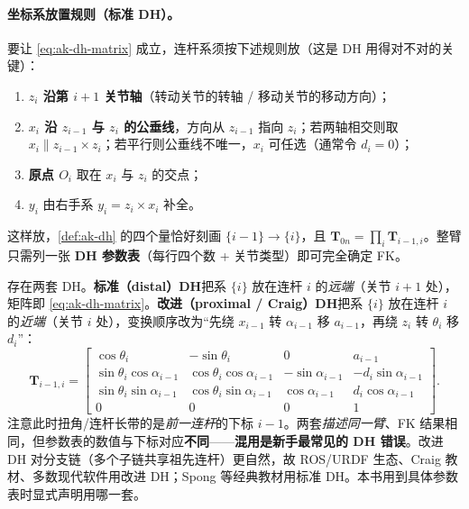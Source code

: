 \paragraph{坐标系放置规则（标准 DH）。}
要让 \cref{eq:ak-dh-matrix} 成立，连杆系须按下述规则放（这是 DH 用得对不对的关键）\cite{spong2006robot}：
\begin{enumerate}
  \item \textbf{$z_i$ 沿第 $i+1$ 关节轴}（转动关节的转轴 / 移动关节的移动方向）；
  \item \textbf{$x_i$ 沿 $z_{i-1}$ 与 $z_i$ 的公垂线}，方向从 $z_{i-1}$ 指向 $z_i$；若两轴相交则取 $x_i\parallel z_{i-1}\times z_i$；若平行则公垂线不唯一，$x_i$ 可任选（通常令 $d_i=0$）；
  \item \textbf{原点 $O_i$} 取在 $x_i$ 与 $z_i$ 的交点；
  \item \textbf{$y_i$} 由右手系 $y_i=z_i\times x_i$ 补全。
\end{enumerate}
这样放，\cref{def:ak-dh} 的四个量恰好刻画 $\{i-1\}\to\{i\}$，且 $\mathbf{T}_{0n}=\prod_i\mathbf{T}_{i-1,i}$。整臂只需列一张 \textbf{DH 参数表}（每行四个数 + 关节类型）即可完全确定 FK。

\begin{note}[标准 DH vs 改进 DH（Craig 约定）]\label{note:ak-dh-modified}
存在两套 DH。\textbf{标准（distal）DH}把系 $\{i\}$ 放在连杆 $i$ 的\emph{远端}（关节 $i+1$ 处），矩阵即 \cref{eq:ak-dh-matrix}。\textbf{改进（proximal / Craig）DH}把系 $\{i\}$ 放在连杆 $i$ 的\emph{近端}（关节 $i$ 处），变换顺序改为“先绕 $x_{i-1}$ 转 $\alpha_{i-1}$ 移 $a_{i-1}$，再绕 $z_i$ 转 $\theta_i$ 移 $d_i$”\cite{spong2006robot}：
\[
  \mathbf{T}_{i-1,i}=
  \begin{bmatrix}
    \cos\theta_i & -\sin\theta_i & 0 & a_{i-1}\\
    \sin\theta_i\cos\alpha_{i-1} & \cos\theta_i\cos\alpha_{i-1} & -\sin\alpha_{i-1} & -d_i\sin\alpha_{i-1}\\
    \sin\theta_i\sin\alpha_{i-1} & \cos\theta_i\sin\alpha_{i-1} & \cos\alpha_{i-1} & d_i\cos\alpha_{i-1}\\
    0 & 0 & 0 & 1
  \end{bmatrix}.
\]
注意此时扭角/连杆长带的是\emph{前一连杆}的下标 $i-1$。两套\emph{描述同一臂}、FK 结果相同，但参数表的数值与下标对应\textbf{不同}——\textbf{混用是新手最常见的 DH 错误}。改进 DH 对分支链（多个子链共享祖先连杆）更自然，故 ROS/URDF 生态、Craig 教材、多数现代软件用改进 DH；Spong 等经典教材用标准 DH。本书用到具体参数表时显式声明用哪一套。
\end{note}

